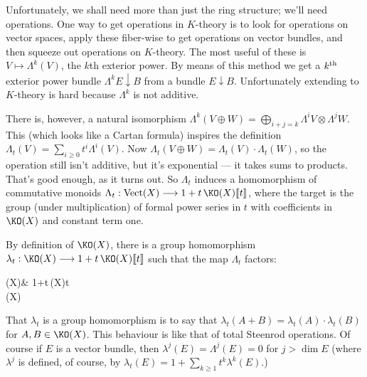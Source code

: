 Unfortunately, we shall need more than just the ring structure; we'll need operations.  One way to get operations in $K$-theory is to look for operations on vector spaces, apply these fiber-wise to get operations on vector bundles, and then squeeze out operations on $K$-theory.  The most useful of these is $V \mapsto \Lambda^k(V)$, the $k$th exterior power.  By means of this method we get a $k^\textup{th}$ exterior power bundle $\Lambda^k E \downarrow B$ from a bundle $E\downarrow B$.  Unfortunately extending to $K$-theory is hard because $\Lambda^k$ is not additive.

There is, however, a natural isomorphism $\Lambda^k(V \oplus W) = \bigoplus_{i+j = k} \Lambda^i V \otimes \Lambda^j W$.  This (which looks like a Cartan formula) inspires the definition $\Lambda_t(V) = \sum_{i \ge 0} t^i \Lambda^i(V)$.  Now $\Lambda_t(V \oplus W) = \Lambda_t(V) \cdot \Lambda_t(W)$, so the operation still isn't additive, but it's exponential --- it takes sums to products.  That's good enough, as it turns out.  So $\Lambda_t$ induces a homomorphism of commutative monoids $\Lambda_t: \Vect(X) \to 1 + t\,\KO(X)\llbracket t \rrbracket$, where the target is the group (under multiplication) of formal power series in $t$ with coefficients in $\KO(X)$ and constant term one.

By definition of $\KO(X)$, there is a group homomorphism $\lambda_t: \KO(X) \to 1+t\,\KO(X) \llbracket t \rrbracket$ such that the map $\Lambda_t$ factors:
\begin{ctikzcd}
\Vect(X)\rar["\Lambda_t"]\dar & 1+t\,\KO(X)\llbracket t \rrbracket\\
\KO(X)\urar["\lambda_t"']
\end{ctikzcd}
That $\lambda_t$ is a group homomorphism is to say that
$\lambda_t(A + B) = \lambda_t(A) \cdot \lambda_t(B)$
for $A, B \in \KO(X)$. This behaviour is like that of total Steenrod operations.  Of course if $E$ is a vector bundle, then $\lambda^j(E) = \Lambda^j(E) = 0$ for $j > \dim E$ (where $\lambda^j$ is defined, of course, by $\lambda_t(E) = 1 + \sum_{k \ge 1} t^k \lambda^k(E)$.)


